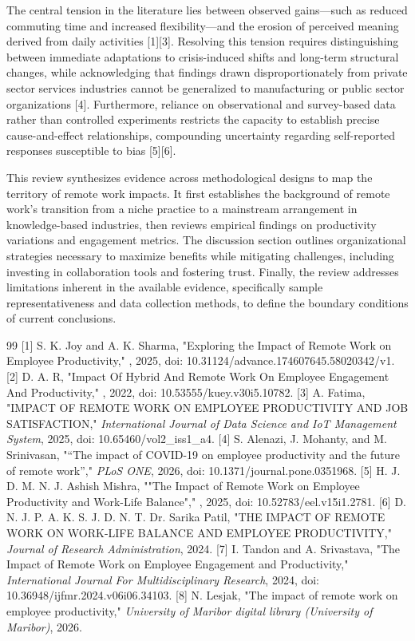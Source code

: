 \documentclass[conference]{IEEEtran}
\begin{document}
The central tension in the literature lies between observed gains—such as reduced commuting time and increased flexibility—and the erosion of perceived meaning derived from daily activities [1][3]. Resolving this tension requires distinguishing between immediate adaptations to crisis-induced shifts and long-term structural changes, while acknowledging that findings drawn disproportionately from private sector services industries cannot be generalized to manufacturing or public sector organizations [4]. Furthermore, reliance on observational and survey-based data rather than controlled experiments restricts the capacity to establish precise cause-and-effect relationships, compounding uncertainty regarding self-reported responses susceptible to bias [5][6].

This review synthesizes evidence across methodological designs to map the territory of remote work impacts. It first establishes the background of remote work's transition from a niche practice to a mainstream arrangement in knowledge-based industries, then reviews empirical findings on productivity variations and engagement metrics. The discussion section outlines organizational strategies necessary to maximize benefits while mitigating challenges, including investing in collaboration tools and fostering trust. Finally, the review addresses limitations inherent in the available evidence, specifically sample representativeness and data collection methods, to define the boundary conditions of current conclusions.

\begin{thebibliography}{99}
 [1] S. K. Joy and A. K. Sharma, "Exploring the Impact of Remote Work on Employee Productivity," , 2025, doi: 10.31124/advance.174607645.58020342/v1.
 [2] D. A. R, "Impact Of Hybrid And Remote Work On Employee Engagement And Productivity," , 2022, doi: 10.53555/kuey.v30i5.10782.
 [3] A. Fatima, "IMPACT OF REMOTE WORK ON EMPLOYEE PRODUCTIVITY AND JOB SATISFACTION," \textit{International Journal of Data Science and IoT Management System}, 2025, doi: 10.65460/vol2\_iss1\_a4.
 [4] S. Alenazi, J. Mohanty, and M. Srinivasan, "“The impact of COVID-19 on employee productivity and the future of remote work”," \textit{PLoS ONE}, 2026, doi: 10.1371/journal.pone.0351968.
 [5] H. J. D. M. N. J. Ashish Mishra, ""The Impact of Remote Work on Employee Productivity and Work-Life Balance"," , 2025, doi: 10.52783/eel.v15i1.2781.
 [6] D. N. J. P. A. K. S. J. D. N. T. Dr. Sarika Patil, "THE IMPACT OF REMOTE WORK ON WORK-LIFE BALANCE AND EMPLOYEE PRODUCTIVITY," \textit{Journal of Research Administration}, 2024.
 [7] I. Tandon and A. Srivastava, "The Impact of Remote Work on Employee Engagement and Productivity," \textit{International Journal For Multidisciplinary Research}, 2024, doi: 10.36948/ijfmr.2024.v06i06.34103.
 [8] N. Lesjak, "The impact of remote work on employee productivity," \textit{University of Maribor digital library (University of Maribor)}, 2026.
\end{thebibliography}
\end{document}
